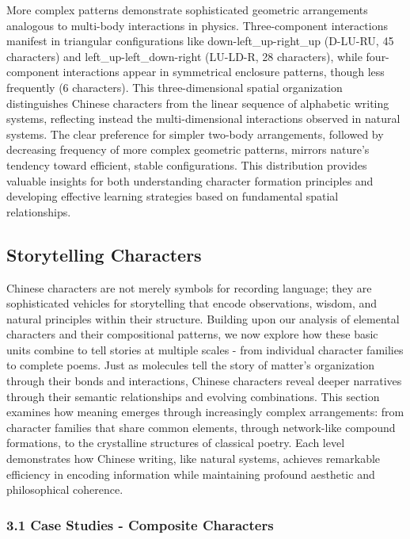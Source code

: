 More complex patterns demonstrate sophisticated geometric arrangements
analogous to multi-body interactions in physics. Three-component
interactions manifest in triangular configurations like
down-left\_up-right\_up (D-LU-RU, 45 characters) and
left\_up-left\_down-right (LU-LD-R, 28 characters), while four-component
interactions appear in symmetrical enclosure patterns, though less
frequently (6 characters). This three-dimensional spatial organization
distinguishes Chinese characters from the linear sequence of alphabetic
writing systems, reflecting instead the multi-dimensional interactions
observed in natural systems. The clear preference for simpler two-body
arrangements, followed by decreasing frequency of more complex geometric
patterns, mirrors nature's tendency toward efficient, stable
configurations. This distribution provides valuable insights for both
understanding character formation principles and developing effective
learning strategies based on fundamental spatial relationships.

\subsection{Storytelling Characters}\label{storytelling-characters}

Chinese characters are not merely symbols for recording language; they
are sophisticated vehicles for storytelling that encode observations,
wisdom, and natural principles within their structure. Building upon our
analysis of elemental characters and their compositional patterns, we
now explore how these basic units combine to tell stories at multiple
scales - from individual character families to complete poems. Just as
molecules tell the story of matter's organization through their bonds
and interactions, Chinese characters reveal deeper narratives through
their semantic relationships and evolving combinations. This section
examines how meaning emerges through increasingly complex arrangements:
from character families that share common elements, through network-like
compound formations, to the crystalline structures of classical poetry.
Each level demonstrates how Chinese writing, like natural systems,
achieves remarkable efficiency in encoding information while maintaining
profound aesthetic and philosophical coherence.

\subsubsection{3.1 Case Studies - Composite
Characters}\label{case-studies---composite-characters}

